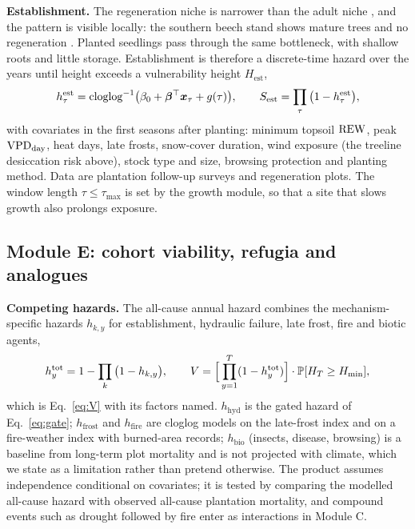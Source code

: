 \textbf{Establishment.} The regeneration niche is narrower than the adult niche \citep{Jackson2009,Dobrowski2015,Davis2019}, and the pattern is visible locally: the southern beech stand shows mature trees and no regeneration \citep{Stepanyan2026}. Planted seedlings pass through the same bottleneck, with shallow roots and little storage. Establishment is therefore a discrete-time hazard over the years until height exceeds a vulnerability height $H_{\text{est}}$,
\begin{equation}\label{eq:est}
h^{\text{est}}_{\tau}=\operatorname{cloglog}^{-1}\!\big(\beta_0+\bm\beta^{\top}\bm x_\tau+g(\tau)\big),\qquad S_{\text{est}}=\prod_{\tau}\big(1-h^{\text{est}}_\tau\big),
\end{equation}
with covariates in the first seasons after planting: minimum topsoil $\mathrm{REW}$, peak $\mathrm{VPD}_{\text{day}}$, heat days, late frosts, snow-cover duration, wind exposure (the treeline desiccation risk above), stock type and size, browsing protection and planting method. Data are plantation follow-up surveys and regeneration plots. The window length $\tau\le\tau_{\max}$ is set by the growth module, so that a site that slows growth also prolongs exposure.

\subsection{Module E: cohort viability, refugia and analogues}\label{sec:E}
\textbf{Competing hazards.} The all-cause annual hazard combines the mechanism-specific hazards $h_{k,y}$ for establishment, hydraulic failure, late frost, fire and biotic agents,
\begin{equation}\label{eq:htot}
h^{\mathrm{tot}}_{y}=1-\prod_k\big(1-h_{k,y}\big),\qquad V=\Big[\prod_{y=1}^{T}(1-h^{\mathrm{tot}}_y)\Big]\cdot\mathbb{P}[H_T\ge H_{\min}],
\end{equation}
which is Eq.~\eqref{eq:V} with its factors named. $h_{\text{hyd}}$ is the gated hazard of Eq.~\eqref{eq:gate}; $h_{\text{frost}}$ and $h_{\text{fire}}$ are cloglog models on the late-frost index and on a fire-weather index with burned-area records; $h_{\text{bio}}$ (insects, disease, browsing) is a baseline from long-term plot mortality and is not projected with climate, which we state as a limitation rather than pretend otherwise. The product assumes independence conditional on covariates; it is tested by comparing the modelled all-cause hazard with observed all-cause plantation mortality, and compound events such as drought followed by fire enter as interactions in Module C.

